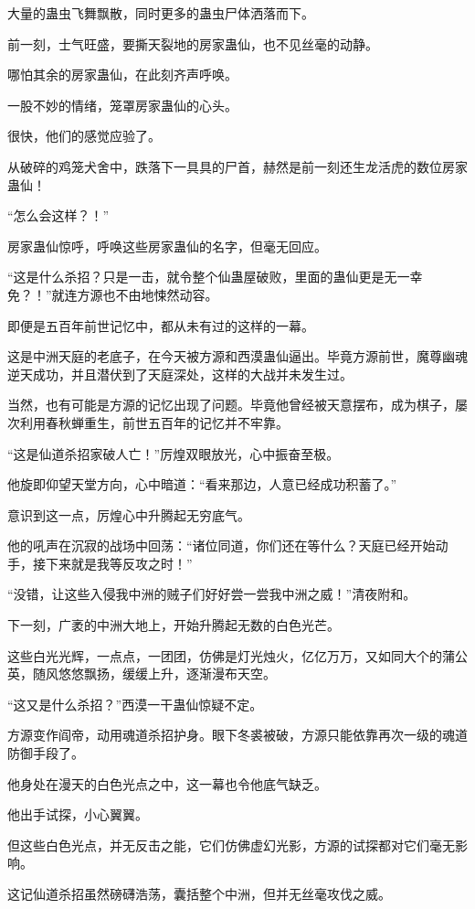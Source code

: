 \begin{this_body}
大量的蛊虫飞舞飘散，同时更多的蛊虫尸体洒落而下。

前一刻，士气旺盛，要撕天裂地的房家蛊仙，也不见丝毫的动静。

哪怕其余的房家蛊仙，在此刻齐声呼唤。

一股不妙的情绪，笼罩房家蛊仙的心头。

很快，他们的感觉应验了。

从破碎的鸡笼犬舍中，跌落下一具具的尸首，赫然是前一刻还生龙活虎的数位房家蛊仙！

“怎么会这样？！”

房家蛊仙惊呼，呼唤这些房家蛊仙的名字，但毫无回应。

“这是什么杀招？只是一击，就令整个仙蛊屋破败，里面的蛊仙更是无一幸免？！”就连方源也不由地悚然动容。

即便是五百年前世记忆中，都从未有过的这样的一幕。

这是中洲天庭的老底子，在今天被方源和西漠蛊仙逼出。毕竟方源前世，魔尊幽魂逆天成功，并且潜伏到了天庭深处，这样的大战并未发生过。

当然，也有可能是方源的记忆出现了问题。毕竟他曾经被天意摆布，成为棋子，屡次利用春秋蝉重生，前世五百年的记忆并不牢靠。

“这是仙道杀招家破人亡！”厉煌双眼放光，心中振奋至极。

他旋即仰望天堂方向，心中暗道：“看来那边，人意已经成功积蓄了。”

意识到这一点，厉煌心中升腾起无穷底气。

他的吼声在沉寂的战场中回荡：“诸位同道，你们还在等什么？天庭已经开始动手，接下来就是我等反攻之时！”

“没错，让这些入侵我中洲的贼子们好好尝一尝我中洲之威！”清夜附和。

下一刻，广袤的中洲大地上，开始升腾起无数的白色光芒。

这些白光光辉，一点点，一团团，仿佛是灯光烛火，亿亿万万，又如同大个的蒲公英，随风悠悠飘扬，缓缓上升，逐渐漫布天空。

“这又是什么杀招？”西漠一干蛊仙惊疑不定。

方源变作阎帝，动用魂道杀招护身。眼下冬裘被破，方源只能依靠再次一级的魂道防御手段了。

他身处在漫天的白色光点之中，这一幕也令他底气缺乏。

他出手试探，小心翼翼。

但这些白色光点，并无反击之能，它们仿佛虚幻光影，方源的试探都对它们毫无影响。

这记仙道杀招虽然磅礴浩荡，囊括整个中洲，但并无丝毫攻伐之威。


\end{this_body}
